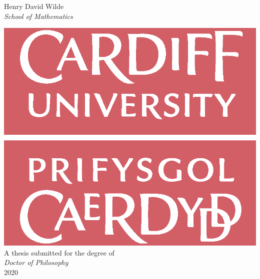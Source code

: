 \begin{titlepage}
    \begin{center}
        
    \vspace*{2em}
    
    \textsc{}

    \vspace{.05\paperheight}
    \huge{%
        Henry David Wilde\\
        \textit{School of Mathematics}
    }

    \vfill

    \includegraphics[width=.3\linewidth]{logo.eps}\\[1ex]

    \vfill
    \huge{%
        A thesis submitted for the degree of\\
        \textit{Doctor of Philosophy}\\[2em]
        2020
    }
    \end{center}
\end{titlepage}
